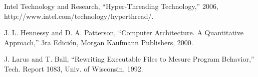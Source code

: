 \documentclass[a4paper,10pt]{article}
\begin{document}
\begin{thebibliography}{99}

 Intel Technology and Research, ``Hyper-Threading Technology,'' 2006, http://www.intel.com/technology/hyperthread/.

 J. L. Hennessy and D. A. Patterson, ``Computer Architecture. A Quantitative
Approach,'' 3ra Edición, Morgan Kaufmann Publishers, 2000.

 J. Larus and T. Ball, ``Rewriting Executable Files to Mesure Program Behavior,'' Tech. Report 1083, Univ. of Wisconsin, 1992.

\end{thebibliography}
\end{document}
